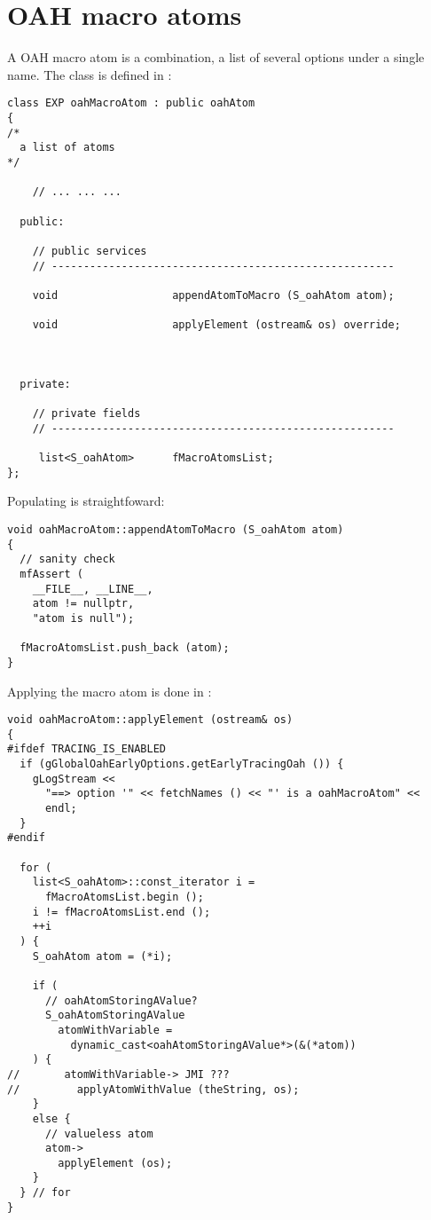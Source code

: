 \section{OAH macro atoms}

A OAH macro atom is a combination, a list of several options under a single name. The  class   is defined in :
\begin{lstlisting}[language=CPlusPlus]
class EXP oahMacroAtom : public oahAtom
{
/*
  a list of atoms
*/

	// ... ... ...

  public:

    // public services
    // ------------------------------------------------------

    void                  appendAtomToMacro (S_oahAtom atom);

    void                  applyElement (ostream& os) override;



  private:

    // private fields
    // ------------------------------------------------------

     list<S_oahAtom>      fMacroAtomsList;
};
\end{lstlisting}

Populating  is straightfoward:
\begin{lstlisting}[language=CPlusPlus]
void oahMacroAtom::appendAtomToMacro (S_oahAtom atom)
{
  // sanity check
  mfAssert (
    __FILE__, __LINE__,
    atom != nullptr,
    "atom is null");

  fMacroAtomsList.push_back (atom);
}
\end{lstlisting}

Applying the macro atom is done in :
\begin{lstlisting}[language=CPlusPlus]
void oahMacroAtom::applyElement (ostream& os)
{
#ifdef TRACING_IS_ENABLED
  if (gGlobalOahEarlyOptions.getEarlyTracingOah ()) {
    gLogStream <<
      "==> option '" << fetchNames () << "' is a oahMacroAtom" <<
      endl;
  }
#endif

  for (
    list<S_oahAtom>::const_iterator i =
      fMacroAtomsList.begin ();
    i != fMacroAtomsList.end ();
    ++i
  ) {
    S_oahAtom atom = (*i);

    if (
      // oahAtomStoringAValue?
      S_oahAtomStoringAValue
        atomWithVariable =
          dynamic_cast<oahAtomStoringAValue*>(&(*atom))
    ) {
//       atomWithVariable-> JMI ???
//         applyAtomWithValue (theString, os);
    }
    else {
      // valueless atom
      atom->
        applyElement (os);
    }
  } // for
}
\end{lstlisting}


